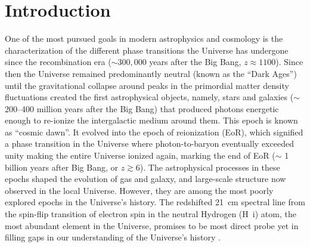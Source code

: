\documentclass[
reprint,
superscriptaddress,
amsmath,
amssymb,
aps,
prd
]{revtex4-1}
\begin{document}
\pacs{}%


\maketitle


\section{Introduction}\label{sec:intro}

One of the most pursued goals in modern astrophysics and cosmology is the characterization of the different phase transitions the Universe has undergone since the recombination era ($\sim 300,000$ years after the Big Bang, $z\approx 1100$). Since then the Universe remained predominantly neutral (known as the ``Dark Ages'') until the gravitational collapse around peaks in the primordial matter density fluctuations created the first astrophysical objects, namely, stars and galaxies ($\sim$ 200--400 million years after the Big Bang) that produced photons energetic enough to re-ionize the intergalactic medium around them. This epoch is known as ``cosmic dawn''. It evolved into the epoch of reionization (EoR), which signified a phase transition in the Universe where photon-to-baryon eventually exceeded unity making the entire Universe ionized again, marking the end of EoR ($\sim$ 1 billion years after Big Bang, or $z\gtrsim 6$). The astrophysical processes in these epochs shaped the evolution of gas and galaxy, and large-scale structure now observed in the local Universe. However, they are among the most poorly explored epochs in the Universe's history. The redshifted 21~cm spectral line from the spin-flip transition of electron spin in the neutral Hydrogen (H~{\sc i}) atom, the most abundant element in the Universe, promises to be most direct probe yet in filling gaps in our understanding of the Universe's history \cite{sun72,sco90,mad97,toz00,ili02,fan02,fan06,bar07,mor10}.
\end{document}

